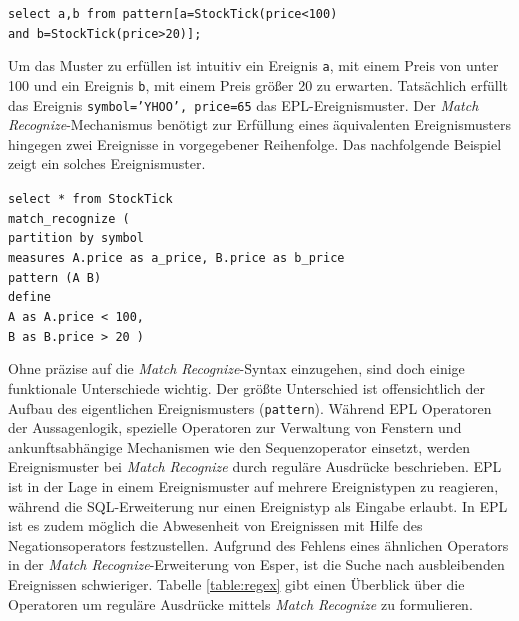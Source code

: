 \documentclass{acm_proc_article-sp}
\begin{document}
\texttt{select a,b from pattern[a=StockTick(price<100)\\
    and b=StockTick(price>20)];}

Um das Muster zu erfüllen ist intuitiv ein Ereignis \texttt{a}, mit einem Preis von unter 
100 und ein Ereignis \texttt{b}, mit einem Preis größer 20 zu erwarten. Tatsächlich 
erfüllt das Ereignis \texttt{{symbol='YHOO', price=65}} das EPL-Ereignismuster. Der 
\emph{Match Recognize}-Mechanismus benötigt zur Erfüllung eines äquivalenten 
Ereignismusters hingegen zwei Ereignisse in vorgegebener Reihenfolge. Das nachfolgende 
Beispiel zeigt ein solches Ereignismuster.

\texttt{select * from StockTick\\
match\_recognize (\\
partition by symbol\\
measures A.price as a\_price, B.price as b\_price\\
pattern (A B)\\
define \\
A as A.price < 100,\\
B as B.price > 20 )
}

Ohne präzise auf die \emph{Match Recognize}-Syntax einzugehen, sind doch einige 
funktionale Unterschiede wichtig. Der größte Unterschied ist offensichtlich der Aufbau 
des eigentlichen Ereignismusters (\texttt{pattern}). Während EPL Operatoren der 
Aussagenlogik, spezielle Operatoren zur Verwaltung von Fenstern und 
ankunftsabhängige Mechanismen wie den Sequenzoperator einsetzt, werden Ereignismuster bei 
\emph{Match Recognize} durch reguläre Ausdrücke beschrieben. EPL ist in der Lage in einem 
Ereignismuster auf mehrere Ereignistypen zu reagieren, während die SQL-Erweiterung nur 
einen Ereignistyp als Eingabe erlaubt. In EPL ist es zudem möglich die Abwesenheit von 
Ereignissen mit Hilfe des Negationsoperators festzustellen. Aufgrund des Fehlens 
eines ähnlichen Operators in der \emph{Match Recognize}-Erweiterung von Esper, ist die 
Suche nach ausbleibenden Ereignissen schwieriger. Tabelle \ref{table:regex} gibt einen 
Überblick über die Operatoren um reguläre Ausdrücke mittels \emph{Match Recognize} 
zu formulieren.
\end{document}
